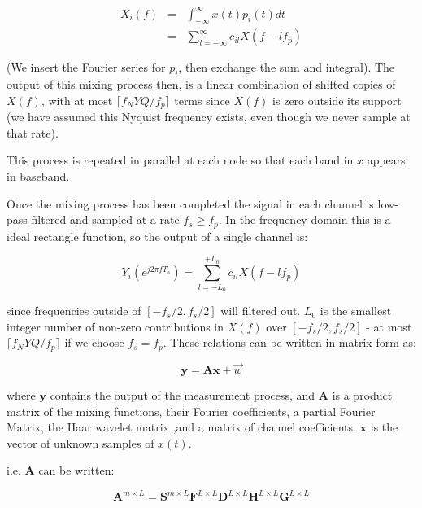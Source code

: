\documentclass{article}
\begin{document}
\begin{align}
X_{i}\left(f\right) &=& \int_{-\infty}^{\infty} x\left(t\right) p_i\left(t\right) dt \nonumber
\\ &=& \sum_{l=-\infty}^{\infty} c_{il} X\left(f-lf_p\right)
\end{align}

(We insert the Fourier series for \(p_i\), then exchange the sum and integral). The output of this mixing process then, is a linear combination of shifted copies of \(X\left(f\right)\), with at most \(\lceil f_NYQ/f_p\rceil\) terms since \(X\left(f\right)\) is zero outside its support (we have assumed this Nyquist frequency exists, even though we never sample at that rate).

This process is repeated in parallel at each node so that each band in \(x\) appears in baseband.

Once the mixing process has been completed the signal in each channel is low-pass filtered and sampled at a rate \(f_s \geq f_p\). In the frequency domain this is a ideal rectangle function, so the output of a single channel is:

\begin{equation}
Y_i\left(e^{j 2 \pi f T_s }\right) = \sum_{l = -L_0}^{+L_0} c_{il} X\left(f-lf_p\right)
\end{equation}

since frequencies outside of \([-f_s/2, f_s/2]\) will filtered out. \(L_0\) is the smallest integer number of non-zero contributions in \(X\left(f\right)\) over \([-f_s/2, f_s/2]\) - at most \(\lceil f_NYQ/f_p\rceil\) if we choose \(f_s = f_p\). These relations can be written in matrix form as:

\begin{equation}
\textbf{y} = \textbf{A}\textbf{x} + \vec{w}
\label{system}
\end{equation}

where \(\textbf{y}\) contains the output of the measurement process, and \(\textbf{A}\) is a product matrix of the mixing functions, their Fourier coefficients, a partial Fourier Matrix, the Haar wavelet matrix ,and a matrix of channel coefficients. \(\textbf{x}\) is the vector of unknown samples of \(x\left(t\right)\). 

i.e. \(\textbf{A}\) can be written: 

\begin{equation}
\textbf{A}^{m\times L} = \textbf{S}^{m\times L} \textbf{F}^{L\times L} \textbf{D}^{L \times L} \textbf{H}^{L \times L}\textbf{G}^{L \times L}
\end{equation}
\end{document}
